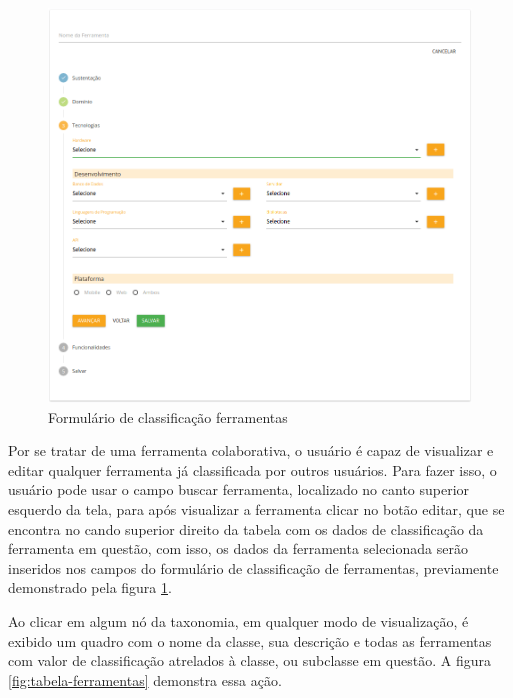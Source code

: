\begin{figure}[!ht]
    \centering
    \includegraphics[scale=0.20]{./figuras/new-ferramenta.png}
    \caption{Formulário de classificação ferramentas}
    \label{fig:new-ferramenta}
\end{figure}

\par
Por se tratar de uma ferramenta colaborativa, o usuário é capaz de visualizar e editar qualquer ferramenta já classificada por outros usuários. 
Para fazer isso, o usuário pode usar o campo buscar ferramenta, localizado no canto superior esquerdo da tela, para após  visualizar a ferramenta clicar no botão editar, que 
se encontra no cando superior direito da tabela com os dados de classificação da ferramenta em questão, com isso, os dados da ferramenta selecionada serão inseridos nos
campos do formulário de classificação de ferramentas, previamente demonstrado pela figura \ref{fig:new-ferramenta}. 

\newpage
\par
Ao clicar em algum nó da taxonomia, em qualquer modo de visualização, é exibido um quadro com o nome da classe, sua descrição e todas as ferramentas
com valor de classificação atrelados à classe, ou subclasse em questão. A figura \ref{fig:tabela-ferramentas} demonstra essa ação. 


